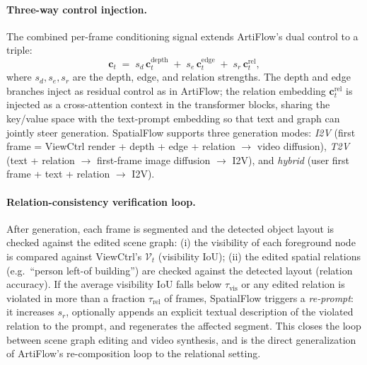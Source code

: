 \paragraph{Three-way control injection.}
The combined per-frame conditioning signal extends ArtiFlow's dual
control to a triple:
\begin{equation}
    \mathbf{c}_t \;=\;
        s_d\, \mathbf{c}_t^\text{depth}
        \;+\; s_e\, \mathbf{c}_t^\text{edge}
        \;+\; s_r\, \mathbf{c}_t^\text{rel},
    \label{eq:triple_control}
\end{equation}
where $s_d, s_e, s_r$ are the depth, edge, and relation strengths.
The depth and edge branches inject as residual control as in ArtiFlow;
the relation embedding $\mathbf{c}_t^\text{rel}$ is injected as a
cross-attention context in the transformer blocks, sharing the
key/value space with the text-prompt embedding so that text and graph
can jointly steer generation. SpatialFlow supports three generation
modes: \emph{I2V} (first frame = ViewCtrl render + depth + edge +
relation $\to$ video diffusion), \emph{T2V} (text + relation $\to$
first-frame image diffusion $\to$ I2V), and \emph{hybrid} (user
first frame + text + relation $\to$ I2V).

\paragraph{Relation-consistency verification loop.}
After generation, each frame is segmented and the detected object
layout is checked against the edited scene graph: (i) the visibility
of each foreground node is compared against ViewCtrl's
$\mathcal{V}_t$ (visibility IoU); (ii) the edited spatial relations
(e.g.\ ``person left-of building'') are checked against the detected
layout (relation accuracy). If the average visibility IoU falls below
$\tau_\text{vis}$ or any edited relation is violated in more than a
fraction $\tau_\text{rel}$ of frames, SpatialFlow triggers a
\emph{re-prompt}: it increases $s_r$, optionally appends an explicit
textual description of the violated relation to the prompt, and
regenerates the affected segment. This closes the loop between scene
graph editing and video synthesis, and is the direct generalization of
ArtiFlow's re-composition loop to the relational setting.

